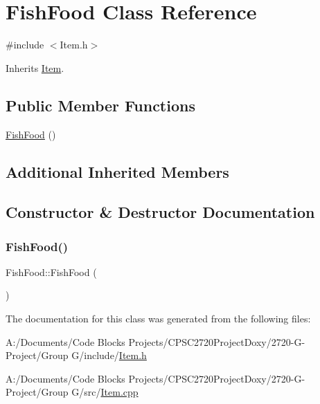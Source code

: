 \hypertarget{class_fish_food}{}\section{Fish\+Food Class Reference}
\label{class_fish_food}


{\ttfamily \#include $<$Item.\+h$>$}



Inherits \mbox{\hyperlink{class_item}{Item}}.

\subsection*{Public Member Functions}
\begin{DoxyCompactItemize}
\item 
\mbox{\hyperlink{class_fish_food_a9aa0dcd43776eb7b0a98941cec3fbc1c}{Fish\+Food}} ()
\end{DoxyCompactItemize}
\subsection*{Additional Inherited Members}


\subsection{Constructor \& Destructor Documentation}
\mbox{\label{class_fish_food_a9aa0dcd43776eb7b0a98941cec3fbc1c}} 
\subsubsection{\texorpdfstring{Fish\+Food()}{FishFood()}}
{\footnotesize\ttfamily Fish\+Food\+::\+Fish\+Food (\begin{DoxyParamCaption}{ }\end{DoxyParamCaption})}



The documentation for this class was generated from the following files\+:\begin{DoxyCompactItemize}
\item 
A\+:/\+Documents/\+Code Blocks Projects/\+C\+P\+S\+C2720\+Project\+Doxy/2720-\/\+G-\/\+Project/\+Group G/include/\mbox{\hyperlink{_item_8h}{Item.\+h}}\item 
A\+:/\+Documents/\+Code Blocks Projects/\+C\+P\+S\+C2720\+Project\+Doxy/2720-\/\+G-\/\+Project/\+Group G/src/\mbox{\hyperlink{_item_8cpp}{Item.\+cpp}}\end{DoxyCompactItemize}
